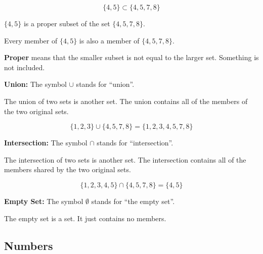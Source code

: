 \documentclass{ximera}
\begin{document}
\[
\{ 4, 5 \} \subset \{ 4, 5, 7, 8 \}
\]

\begin{center}

$\{ 4, 5 \}$ is a proper subset of the set $\{ 4, 5, 7, 8 \}$.  

Every member of $\{ 4, 5 \}$ is also a member of $\{ 4, 5, 7, 8 \}$. 

\end{center}





\textbf{Proper} means that the smaller subset is not equal to the larger set. Something is not included.












\textbf{\textcolor{blue!55!black}{Union:}}  The symbol $\cup$ stands for ``union''.


The union of two sets is another set.  The union contains all of the members of the two original sets.

\[
\{ 1, 2, 3 \} \cup \{ 4, 5, 7, 8 \} = \{ 1, 2, 3, 4, 5, 7, 8 \}
\]








\textbf{\textcolor{blue!55!black}{Intersection:}}  The symbol $\cap$ stands for ``intersection''.

The intersection of two sets is another set.  The intersection contains all of the members shared by the two original sets.

\[
\{ 1, 2, 3, 4, 5 \} \cap \{ 4, 5, 7, 8 \} = \{ 4, 5 \}
\]








\textbf{\textcolor{blue!55!black}{Empty Set:}}  The symbol $\emptyset$ stands for ``the empty set''.

The empty set is a set.  It just contains no members.














\subsection*{Numbers}
\end{document}
